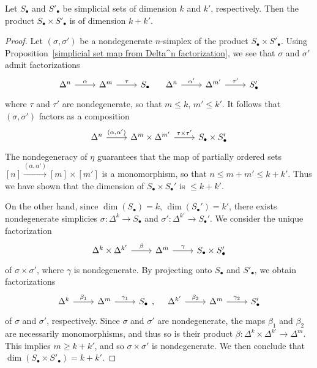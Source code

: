 \begin{proposition}\label{simplicial set dimension product}
Let $S_\bullet$ and $S'_\bullet$ be simplicial sets of dimension $k$ and $k'$, respectively. Then the product $S_\bullet\times S'_\bullet$ is of dimension $k+k'$.
\end{proposition}
\begin{proof}
Let $(\sigma,\sigma')$ be a nondegenerate $n$-simplex of the product $S_\bullet\times S'_\bullet$. Using Proposition~\ref{simplicial set map from Delta^n factorization}, we see that $\sigma$ and $\sigma'$ admit factorizations
\[\begin{tikzcd}
\Delta^n\ar[r,"\alpha"]&\Delta^{m}\ar[r,"\tau"]&S_\bullet
\end{tikzcd}\quad \begin{tikzcd}
\Delta^n\ar[r,"\alpha'"]&\Delta^{m'}\ar[r,"\tau'"]&S'_\bullet
\end{tikzcd}\]
where $\tau$ and $\tau'$ are nondegenerate, so that $m\leq k$, $m'\leq k'$. It follows that $(\sigma,\sigma')$ factors as a composition
\[\begin{tikzcd}
\Delta^n\ar[r,"{(\alpha,\alpha')}"]&\Delta^m\times\Delta^{m'}\ar[r,"{\tau\times\tau'}"]&S_\bullet\times S'_\bullet
\end{tikzcd}\]
The nondegeneracy of $\eta$ guarantees that the map of partially ordered sets $[n]\stackrel{(\alpha,\alpha')}{\to}[m]\times[m']$ is a monomorphism, so that $n\leq m+m'\leq k+k'$. Thus we have shown that the dimension of $S_\bullet\times S_\bullet'$ is $\leq k+k'$.\par
On the other hand, since $\dim(S_\bullet)=k$, $\dim(S_\bullet')=k'$, there exists nondegenerate simplicies $\sigma:\Delta^k\to S_\bullet$ and $\sigma':\Delta^{k'}\to S_\bullet'$. We consider the unique factorization
\[\begin{tikzcd}
\Delta^k\times\Delta^{k'}\ar[r,"\beta"]&\Delta^m\ar[r,"\gamma"]&S_\bullet\times S_\bullet'
\end{tikzcd}\]
of $\sigma\times\sigma'$, where $\gamma$ is nondegenerate. By projecting onto $S_\bullet$ and $S'_\bullet$, we obtain factorizations
\[\begin{tikzcd}
\Delta^k\ar[r,"\beta_1"]&\Delta^m\ar[r,"\gamma_1"]&S_\bullet
\end{tikzcd},\quad\begin{tikzcd}
\Delta^{k'}\ar[r,"\beta_2"]&\Delta^m\ar[r,"\gamma_2"]&S'_\bullet
\end{tikzcd}\]
of $\sigma$ and $\sigma'$, respectively. Since $\sigma$ and $\sigma'$ are nondegenerate, the maps $\beta_1$ and $\beta_2$ are necessarily monomorphisms, and thus so is their product $\beta:\Delta^k\times\Delta^{k'}\to\Delta^m$. This implies $m\geq k+k'$, and so $\sigma\times\sigma'$ is nondegenerate. We then conclude that $\dim(S_\bullet\times S'_\bullet)=k+k'$.
\end{proof}
